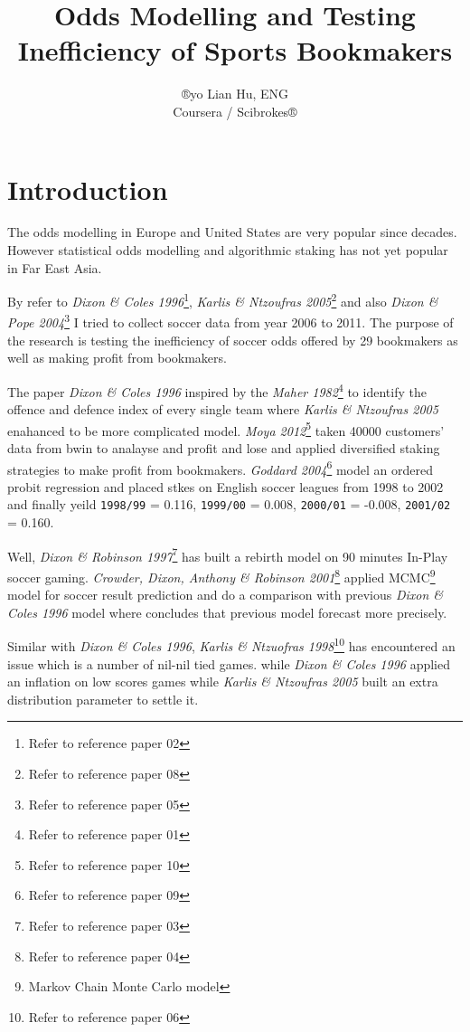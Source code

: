 \documentclass[article]{jss}
\author{
®yo Lian Hu, ENG\\Coursera / Scibrokes®
}
\title{Odds Modelling and Testing Inefficiency of Sports Bookmakers
\pkg{Rmodel}}
\begin{document}
\section{Introduction}\label{introduction}

The odds modelling in Europe and United States are very popular since
decades. However statistical odds modelling and algorithmic staking has
not yet popular in Far East Asia. \bigbreak

By refer to \emph{Dixon \& Coles 1996}\footnote{Refer to reference paper
  02}, \emph{Karlis \& Ntzoufras 2005}\footnote{Refer to reference paper
  08} and also \emph{Dixon \& Pope 2004}\footnote{Refer to reference
  paper 05} I tried to collect soccer data from year 2006 to 2011. The
purpose of the research is testing the inefficiency of soccer odds
offered by 29 bookmakers as well as making profit from bookmakers.
\bigbreak

The paper \emph{Dixon \& Coles 1996} inspired by the \emph{Maher
1982}\footnote{Refer to reference paper 01} to identify the offence and
defence index of every single team where \emph{Karlis \& Ntzoufras 2005}
enahanced to be more complicated model. \emph{Moya 2012}\footnote{Refer
  to reference paper 10} taken 40000 customers' data from bwin to
analayse and profit and lose and applied diversified staking strategies
to make profit from bookmakers. \emph{Goddard 2004}\footnote{Refer to
  reference paper 09} model an ordered probit regression and placed
stkes on English soccer leagues from 1998 to 2002 and finally yeild
\texttt{1998/99} = 0.116, \texttt{1999/00} = 0.008, \texttt{2000/01} =
-0.008, \texttt{2001/02} = 0.160. \bigbreak

Well, \emph{Dixon \& Robinson 1997}\footnote{Refer to reference paper 03}
has built a rebirth model on 90 minutes In-Play soccer gaming.
\emph{Crowder, Dixon, Anthony \& Robinson 2001}\footnote{Refer to
  reference paper 04} applied MCMC\footnote{Markov Chain Monte Carlo
  model} model for soccer result prediction and do a comparison with
previous \emph{Dixon \& Coles 1996} model where concludes that previous
model forecast more precisely. \bigbreak

Similar with \emph{Dixon \& Coles 1996}, \emph{Karlis \& Ntzuofras
1998}\footnote{Refer to reference paper 06} has encountered an issue
which is a number of nil-nil tied games. while \emph{Dixon \& Coles
1996} applied an inflation on low scores games while \emph{Karlis \&
Ntzoufras 2005} built an extra distribution parameter to settle it.
\bigbreak
\end{document}
